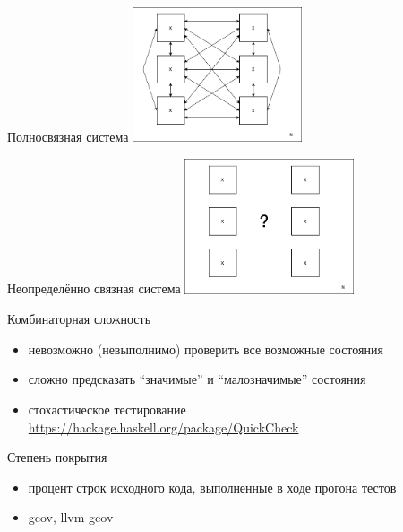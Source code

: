 \documentclass[unknownkeysallowed,xcolor=table]{beamer}
\begin{document}
\begin{frame}{Полносвязная система}
  \includegraphics[align=c,width=5cm,keepaspectratio]{images/unit_testing/interconnected_caption.png}
\end{frame}

\begin{frame}{Неопределённо связная система}
  \includegraphics[align=c,width=5cm,keepaspectratio]{images/unit_testing/unknown.png}
\end{frame}

\begin{frame}{Комбинаторная сложность}
  \begin{itemize}
    \item невозможно (невыполнимо) проверить все возможные состояния \vspace{2em}
    \item сложно предсказать ``значимые'' и ``малозначимые'' состояния \vspace{2em}
    \item стохастическое тестирование \url{https://hackage.haskell.org/package/QuickCheck}
  \end{itemize}
\end{frame}

\begin{frame}{Степень покрытия}
  \begin{itemize}
    \item процент строк исходного кода, выполненные в ходе прогона тестов \vspace{2em}
    \item gcov, llvm-gcov
  \end{itemize}
\end{frame}
\end{document}
